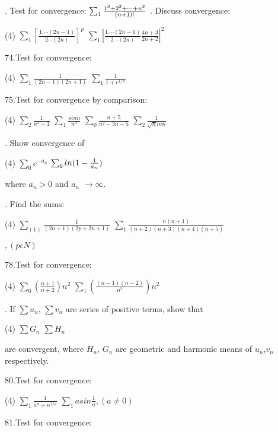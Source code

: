 \documentclass[11pt]{amsbook}
\begin{document}
\hfill {}. Test for convergence: $\sum_{1}\frac{1^{3}+2^{3}+\cdots+n^{3}}{(n+1)!}\\$
\hfill {}. Discuss convergence:
\hfill \break
\begin{tasks}(4)
\task $\sum_{1}[\frac{1. \cdots(2n-1)}{2\cdots(2n)}]^{p}$
\task $\sum_{1}|\frac{1. \cdots(2n-1)}{2\cdots(2n)}\frac{4n+3}{2n+2}|^{2}$
\end{tasks}

\hfill \break
74.Test for convergence:
\hfill \break
\begin{tasks}(4)
\task $\sum_{1}\frac{1}{(2n-1)(2n+1)}$
\task $\sum_{1}\frac{1}{1+e^{1/n}}$
\end{tasks}

\hfill \break
75.Test for convergence by comparison:

\begin{tasks}(4)
\task $\sum_{2}\frac{1}{n^{3}-1}$
\task $\sum_{1}\frac{sinn}{n^{3}}$
\task $\sum_{0}\frac{n+5}{n^{2}-3n-5}$
\task $\sum_{2}\frac{1}{\sqrt{{n}}lnn}$
\end{tasks}

\hfill {}. Show convergence of

\begin{tasks}(4)
\task $\sum_{0}e^{{-a}_n}$
\task $\sum_{0}ln(1-\frac{1}{a_{n}})\\$
\end{tasks}

where $a_{n}>0$ and $a_{n}$ $\rightarrow \infty$.

\hfill {}. Find the sums:

\begin{tasks}(4)
\task $\sum_{(1)}\frac{1}{(2n+1)(2p+2n+1)}$
\task $\sum_{1}\frac{n(n+1)}{(n+2)(n+3)(n+4)(n+5)}$
\end{tasks}
\hspace{1cm}$, (p\epsilon{N})$


\hfill \break
78.Test for convergence:

\begin{tasks}(4)
\task $\sum_{0}(\frac{n+1}{n+2})n^2$
\task $\sum_{1}(\frac{(n-1)(n-2)}{n^2})n^2$
\end{tasks}

\hfill {}. If  $\sum{u}_n$, $\sum{v}_n$ are series of positive terms, show that

\begin{tasks}(4)
\task $\sum{G}_n$
\task $\sum{H}_n$
\end{tasks}
are convergent, where $H_n$, $G_n$ are geometric and harmonic means of $u_n$,$v_n$ respectively.

\hfill \break
80.Test for convergence:
\hfill \break
\begin{tasks}(4)
\task $\sum_{1}\frac{1}{a^n+n^{1/a}}$
\task $\sum_{1}asin\frac{1}{n},(a\ne0)$
\end{tasks}
\hfill \break
81.Test for convergence:
\end{document}
